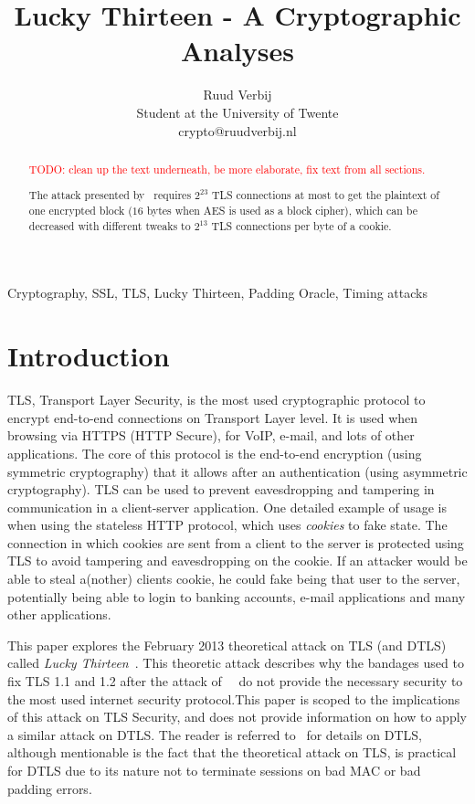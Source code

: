 \documentclass[10pt,conference,a4paper]{IEEEtran}
\title{Lucky Thirteen - A Cryptographic Analyses}
\author{Ruud Verbij \\ Student at the University of Twente \\ crypto@ruudverbij.nl}
\begin{document}
\maketitle



\begin{abstract}
\textcolor{red}{TODO: clean up the text underneath, be more elaborate, fix text from all sections.}

The attack presented by~\citeauthor{alfardan2013lucky} requires $2^{23}$ TLS connections at most to get the plaintext of one encrypted block ($16$ bytes when AES is used as a block cipher), which can be decreased with different tweaks to $2^{13}$ TLS connections per byte of a cookie.
\end{abstract}



\begin{IEEEkeywords}
Cryptography, SSL, TLS, Lucky Thirteen, Padding Oracle, Timing attacks
\end{IEEEkeywords}



\section{Introduction}
\label{sec:intro}
TLS, Transport Layer Security, is the most used cryptographic protocol to encrypt end-to-end connections on Transport Layer level. It is used when browsing via HTTPS (HTTP Secure), for VoIP, e-mail, and lots of other applications. The core of this protocol is the end-to-end encryption (using symmetric cryptography) that it allows after an authentication (using asymmetric cryptography). TLS can be used to prevent eavesdropping and tampering in communication in a client-server application. One detailed example of usage is when using the stateless HTTP protocol, which uses \textit{cookies} to fake state. The connection in which cookies are sent from a client to the server is protected using TLS to avoid tampering and eavesdropping on the cookie. If an attacker would be able to steal a(nother) clients cookie, he could fake being that user to the server, potentially being able to login to banking accounts, e-mail applications and many other applications.

This paper explores the February 2013 theoretical attack on TLS (and DTLS) called \textit{Lucky Thirteen}~\cite{alfardan2013lucky}. This theoretic attack describes why the bandages used to fix TLS 1.1 and 1.2 after the attack of~\citeauthor{canvel2003password}~\cite{canvel2003password} do not provide the necessary security to the most used internet security protocol.This paper is scoped to the implications of this attack on TLS Security, and does not provide information on how to apply a similar attack on DTLS. The reader is referred to~\cite{alfardan2013lucky} for details on DTLS, although mentionable is the fact that the theoretical attack on TLS, is practical for DTLS due to its nature not to terminate sessions on bad MAC or bad padding errors.
\end{document}
